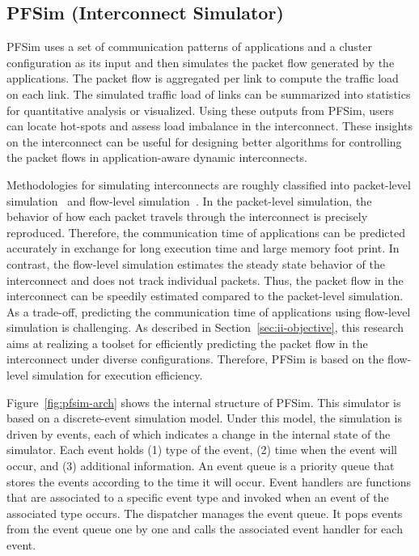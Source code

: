 \subsection{PFSim (Interconnect Simulator)}\label{sec:ii-pfsim}

PFSim uses a set of communication patterns of applications and a cluster
configuration as its input and then simulates the packet flow generated
by the applications. The packet flow is aggregated per link to compute
the traffic load on each link. The simulated traffic load of links can
be summarized into statistics for quantitative analysis or visualized.
Using these outputs from PFSim, users can locate hot-spots and assess
load imbalance in the interconnect. These insights on the interconnect
can be useful for designing better algorithms for controlling the packet
flows in application-aware dynamic interconnects.

Methodologies for simulating interconnects are roughly classified into
packet-level simulation~\cite{Hoefler2010} and flow-level
simulation~\cite{Schneider2009}. In the packet-level simulation, the behavior
of how each packet travels through the interconnect is precisely reproduced.
Therefore, the communication time of applications can be predicted accurately
in exchange for long execution time and large memory foot print. In contrast,
the flow-level simulation estimates the steady state behavior of the
interconnect and does not track individual packets. Thus, the packet flow in
the interconnect can be speedily estimated compared to the packet-level
simulation. As a trade-off, predicting the communication time of applications
using flow-level simulation is challenging. As described in
Section~\ref{sec:ii-objective}, this research aims at realizing a toolset for
efficiently predicting the packet flow in the interconnect under diverse
configurations. Therefore, PFSim is based on the flow-level simulation for
execution efficiency.

Figure~\ref{fig:pfsim-arch} shows the internal structure of PFSim. This
simulator is based on a discrete-event simulation model. Under this model, the
simulation is driven by events, each of which indicates a change in the
internal state of the simulator. Each event holds (1) type of the event, (2)
time when the event will occur, and (3) additional information. An event
queue is a priority queue that stores the events according to the time it will
occur. Event handlers are functions that are associated to a specific event
type and invoked when an event of the associated type occurs. The dispatcher
manages the event queue. It pops events from the event queue one by one and
calls the associated event handler for each event.


